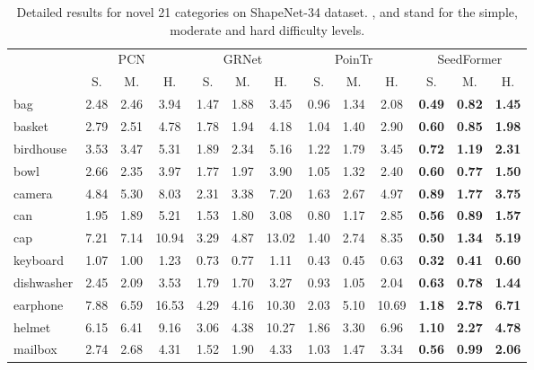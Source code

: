 \begin{table*}[t]
	\centering
\scriptsize
	\setlength{\tabcolsep}{4.5pt}
\caption{Detailed results for novel 21 categories on ShapeNet-34 dataset. ,  and  stand for the simple, moderate and hard difficulty levels.}
	\vspace{5pt}
	\begin{tabular}{l|ccc|ccc|ccc|ccc}
		\toprule[1pt]
		& \multicolumn{3}{c|}{PCN~\cite{yuan2018pcn}} & \multicolumn{3}{c|}{GRNet~\cite{xie2020grnet}} & \multicolumn{3}{c|}{PoinTr~\cite{yu2021pointr}} & \multicolumn{3}{c}{SeedFormer} \\
		& S. & M. & H. & S. & M. & H. & S. & M. & H. & S. & M. & H.\\
		\midrule[0.3pt]
		bag			& 2.48 & 2.46 & 3.94 & 1.47 & 1.88 & 3.45 & 0.96 & 1.34 & 2.08 & \textbf{0.49} & \textbf{0.82} & \textbf{1.45} \\
		basket		& 2.79 & 2.51 & 4.78 & 1.78 & 1.94 & 4.18 & 1.04 & 1.40 & 2.90 & \textbf{0.60} & \textbf{0.85} & \textbf{1.98} \\
		birdhouse	& 3.53 & 3.47 & 5.31 & 1.89 & 2.34 & 5.16 & 1.22 & 1.79 & 3.45 & \textbf{0.72} & \textbf{1.19} & \textbf{2.31} \\
		bowl		& 2.66 & 2.35 & 3.97 & 1.77 & 1.97 & 3.90 & 1.05 & 1.32 & 2.40 & \textbf{0.60} & \textbf{0.77} & \textbf{1.50} \\
		camera		& 4.84 & 5.30 & 8.03 & 2.31 & 3.38 & 7.20 & 1.63 & 2.67 & 4.97 & \textbf{0.89} & \textbf{1.77} & \textbf{3.75} \\
		can			& 1.95 & 1.89 & 5.21 & 1.53 & 1.80 & 3.08 & 0.80 & 1.17 & 2.85 & \textbf{0.56} & \textbf{0.89} & \textbf{1.57} \\
		cap			& 7.21 & 7.14 & 10.94 & 3.29 & 4.87 & 13.02 & 1.40 & 2.74 & 8.35 & \textbf{0.50} & \textbf{1.34} & \textbf{5.19} \\
		keyboard	& 1.07 & 1.00 & 1.23 & 0.73 & 0.77 & 1.11 & 0.43 & 0.45 & 0.63 & \textbf{0.32} & \textbf{0.41} & \textbf{0.60} \\
		dishwasher	& 2.45 & 2.09 & 3.53 & 1.79 & 1.70 & 3.27 & 0.93 & 1.05 & 2.04 & \textbf{0.63} & \textbf{0.78} & \textbf{1.44} \\
		earphone	& 7.88 & 6.59 & 16.53 & 4.29 & 4.16 & 10.30 & 2.03 & 5.10 & 10.69 & \textbf{1.18} & \textbf{2.78} & \textbf{6.71} \\
		helmet		& 6.15 & 6.41 & 9.16 & 3.06 & 4.38 & 10.27 & 1.86 & 3.30 & 6.96 & \textbf{1.10} & \textbf{2.27} & \textbf{4.78} \\
		mailbox		& 2.74 & 2.68 & 4.31 & 1.52 & 1.90 & 4.33 & 1.03 & 1.47 & 3.34 & \textbf{0.56} & \textbf{0.99} & \textbf{2.06} \\

\end{tabular}
\end{table*}
